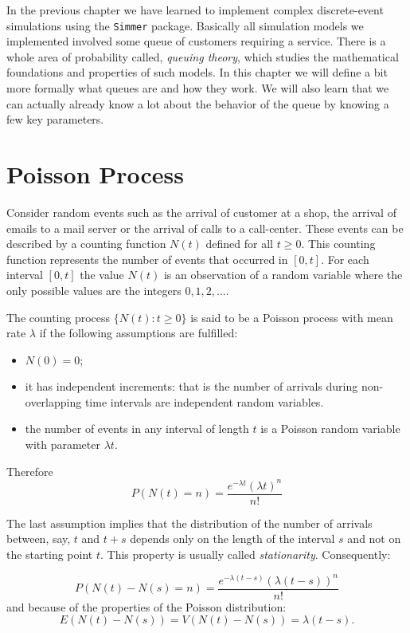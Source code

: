 \documentclass[
]{book}
\begin{document}
In the previous chapter we have learned to implement complex discrete-event simulations using the \texttt{Simmer} package. Basically all simulation models we implemented involved some queue of customers requiring a service. There is a whole area of probability called, \emph{queuing theory}, which studies the mathematical foundations and properties of such models. In this chapter we will define a bit more formally what queues are and how they work. We will also learn that we can actually already know a lot about the behavior of the queue by knowing a few key parameters.

\hypertarget{poisson-process}{%
\section{Poisson Process}\label{poisson-process}}

Consider random events such as the arrival of customer at a shop, the arrival of emails to a mail server or the arrival of calls to a call-center. These events can be described by a counting function \(N(t)\) defined for all \(t\geq 0\). This counting function represents the number of events that occurred in \([0,t]\). For each interval \([0,t]\) the value \(N(t)\) is an observation of a random variable where the only possible values are the integers \(0,1,2,\dots\).

The counting process \(\{N(t): t\geq 0\}\) is said to be a Poisson process with mean rate \(\lambda\) if the following assumptions are fulfilled:

\begin{itemize}
\item
  \(N(0) = 0\);
\item
  it has independent increments: that is the number of arrivals during non-overlapping time intervals are independent random variables.
\item
  the number of events in any interval of length \(t\) is a Poisson random variable with parameter \(\lambda t\).
\end{itemize}

Therefore
\[
P(N(t)=n)=\frac{e^{-\lambda t}(\lambda t)^n}{n!}
\]

The last assumption implies that the distribution of the number of arrivals between, say, \(t\) and \(t+s\) depends only on the length of the interval \(s\) and not on the starting point \(t\). This property is usually called \emph{stationarity}. Consequently:

\[
P(N(t)-N(s)=n)=\frac{e^{-\lambda(t-s)}(\lambda(t-s))^n}{n!}
\]
and because of the properties of the Poisson distribution:
\[
E(N(t)-N(s))=V(N(t)-N(s))=\lambda(t-s).
\]
\end{document}
